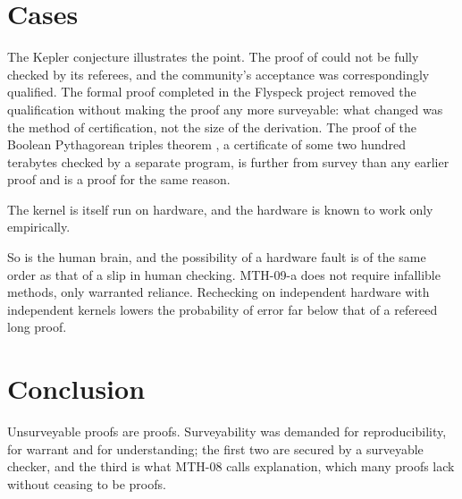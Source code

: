 \documentclass{situationist-preprint}
\begin{document}
\section{Cases}

The Kepler conjecture illustrates the point. The proof of \citet{Hales2005} could not be fully checked by its referees, and the community's acceptance was correspondingly qualified. The formal proof completed in the Flyspeck project \citep{HalesEtAl2017} removed the qualification without making the proof any more surveyable: what changed was the method of certification, not the size of the derivation. The proof of the Boolean Pythagorean triples theorem \citep{HeuleEtAl2016}, a certificate of some two hundred terabytes checked by a separate program, is further from survey than any earlier proof and is a proof for the same reason.

\begin{objection}
The kernel is itself run on hardware, and the hardware is known to work only empirically.
\end{objection}

\begin{reply}
So is the human brain, and the possibility of a hardware fault is of the same order as that of a slip in human checking. MTH-09-a does not require infallible methods, only warranted reliance. Rechecking on independent hardware with independent kernels lowers the probability of error far below that of a refereed long proof.
\end{reply}

\section{Conclusion}

Unsurveyable proofs are proofs. Surveyability was demanded for reproducibility, for warrant and for understanding; the first two are secured by a surveyable checker, and the third is what MTH-08 calls explanation, which many proofs lack without ceasing to be proofs.
\end{document}
